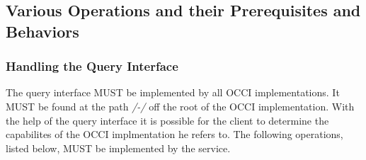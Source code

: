 \documentclass[10pt,a4paper]{article}
\begin{document}
\subsection{Various Operations and their Prerequisites and Behaviors}

\subsubsection{Handling the Query Interface}
\label{sec:query}
The query interface MUST be implemented by all OCCI
implementations. It MUST be found at the path \emph{/-/} off the root
of the OCCI implementation. With the help of the query interface it is
possible for the client to determine the capabilites of the OCCI
implmentation he refers to. The following operations, listed below,
MUST be implemented by the service.
\end{document}
